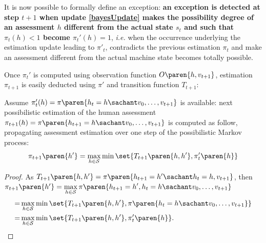 It is now possible to formally define an exception: 
\textbf{an exception is detected at step $t+1$ 
when update \ref{bayesUpdate} 
makes the possibility degree of an assessment $h$
different from the actual state $s_t$ and 
such that $\pi_t(h)<1$ 
become $\pi_t'(h)=1$}, 
\textit{i.e.} when the occurrence underlying 
the estimation update leading to $\pi'_t$,
contradicts the previous estimation $\pi_t$ and
make an assessment different from the actual machine
state becomes totally possible.

Once $\pi_t'$ is computed 
using observation function $O \paren{h,v_{t+1}}$, 
estimation $\pi_{t+1}$ is easily deducted 
using $\pi'$ and transition function $T_{t+1}$:
\begin{theorem}
Assume $\pi_t'(h)=\pi \paren{ h_t=h \sachant v_0, \ldots, v_{t+1} }$ 
is available: 
next possibilistic estimation of the human assessment 
$\pi_{t+1}(h) = \pi \paren{ h_{t+1} = h \sachant v_0, \ldots, v_{t+1} }$ 
is computed as follow, propagating assessment estimation
over one step of the possibilistic Markov process:
\begin{equation} 
\label{recestimH}
\pi_{t+1} \paren{h'} = \max_{h \in \mathcal{S}} \min \set{ T_{t+1} \paren{h, h'}, \pi_t' \paren{ h }  } 
\end{equation}
\end{theorem}
\begin{proof}
As $T_{t+1} \paren{h, h'} =\pi \paren{ h_{t+1} = h' \sachant h_t=h, v_{t+1}  }$, then
$\pi_{t+1} \paren{ h' } =  \displaystyle \max_{h \in \mathcal{S}} \pi \paren{ h_{t+1} = h', h_t = h \sachant v_0, \ldots, v_{t+1} } $	
\begin{eqnarray*}
 = & \displaystyle \max_{h \in \mathcal{S}} \min \set{ T_{t+1} \paren{ h, h' }, \pi \paren{ h_t = h \sachant v_0, \ldots, v_{t+1} } } \\
 = & \displaystyle \max_{h \in \mathcal{S}} \min \set{ T_{t+1} \paren{ h, h' }, \pi_{t}' \paren{h}  }.
\end{eqnarray*}
\end{proof}


